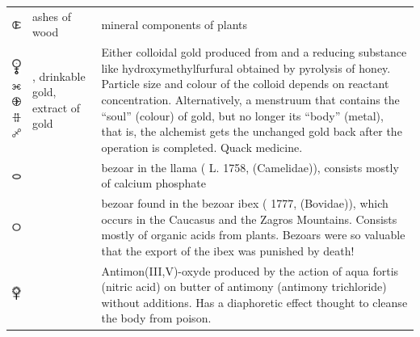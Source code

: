 \documentclass[british,final,landscape]{scrartcl}
\begin{document}
\begin{refsection}
\begin{supertabular}{p{0.3\textwidth}p{0.34\textwidth}p{0.34\textwidth}}
   \includegraphics[width=5mm]{Mixtures/AshesOfWood} & ashes of wood & mineral components of plants  \\
   \includegraphics[height=5mm]{Mixtures/AurumPotabile} \includegraphics[width=5mm]{Mixtures/AurumPotabile2} \includegraphics[width=5mm]{Mixtures/AurumPotabile3} \includegraphics[width=5mm]{Mixtures/AurumPotabile4} \includegraphics[width=5mm]{Mixtures/AurumPotabile5} & , drinkable gold, extract of gold & Either colloidal gold produced from  and a reducing substance like hydroxymethylfurfural obtained by pyrolysis of honey. Particle size and colour of the colloid depends on reactant concentration. Alternatively, a menstruum that contains the ``soul'' (colour) of gold, but no longer its ``body'' (metal), that is, the alchemist gets the unchanged gold back after the operation is completed. Quack medicine. \\
   \includegraphics[width=5mm]{Mixtures/BezoarOccidentalis}  &  & bezoar in the llama ( L. 1758, (Camelidae)), consists mostly of calcium phosphate \\
   \includegraphics[width=5mm]{Mixtures/BezoarOrientalis}  &  & bezoar found in the  bezoar ibex (  1777, (Bovidae)), which occurs in the Caucasus and the Zagros Mountains. Consists mostly of organic acids from plants. Bezoars were so valuable that the export of the ibex was punished by death!\\
   \includegraphics[width=5mm]{Mixtures/BezoardicumMinerale} &    & Antimon(III,V)-oxyde  produced by the action of aqua fortis (nitric acid) on butter of antimony (antimony trichloride) without additions. Has a diaphoretic effect thought to cleanse the body from poison. \\

\end{supertabular}
\end{refsection}
\end{document}
